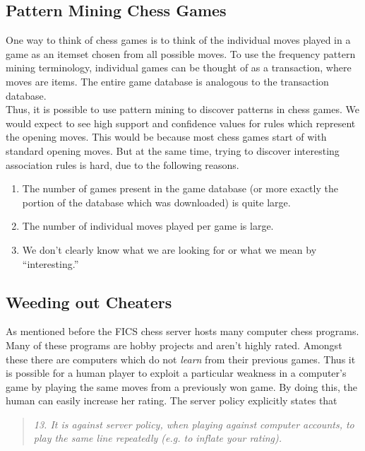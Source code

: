 \documentclass{article}
\begin{document}
\subsection{Pattern Mining Chess Games}
One way to think of chess games is to think of the individual moves
played in a game as an itemset chosen from all possible moves. To use
the frequency pattern mining terminology, individual games can be
thought of as a transaction, where moves are items. The entire game
database is analogous to the transaction database. \\

Thus, it is possible to use pattern mining to discover patterns in
chess games. We would expect to see high support and confidence values
for rules which represent the opening moves. This would be because
most chess games start of with standard opening moves. But at the same
time, trying to discover interesting association rules is hard, due to
the following reasons.

\begin{enumerate}
\item The number of games present in the game database (or more exactly the portion of the database which was downloaded) is quite large. 

\item The number of individual moves played per game is large.

\item We don't clearly know what we are looking for or what we mean by  ``interesting.''

\end{enumerate}

\subsection{Weeding out Cheaters}
As mentioned before the FICS chess server hosts many computer chess programs. Many of these programs are hobby projects and aren't highly rated. Amongst these there are computers which do not {\sl learn} from their previous games. Thus it is possible for a human player to exploit a particular weakness in a computer's game by playing the same moves from a previously won game. By doing this, the human can easily increase her rating. The server policy explicitly states that \cite{web:ficspolicy}
\begin{quote}
{\sl 13. It is against server policy, when playing against computer accounts, to play the same line repeatedly (e.g. to inflate your rating).}
\end{quote}
\end{document}
